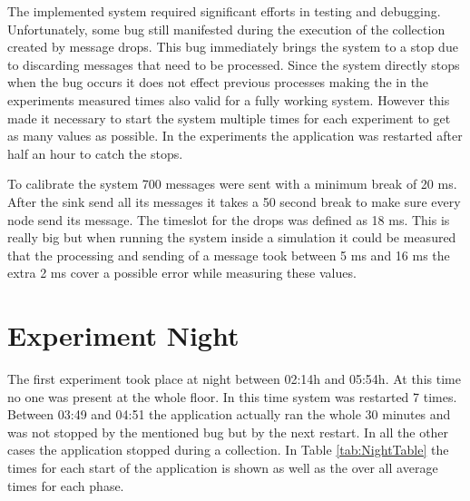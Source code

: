 The implemented system required significant efforts in testing and debugging. Unfortunately, some bug still manifested during the execution of the collection created by message drops. This bug immediately brings the system to a stop due to discarding messages that need to be processed. Since the system directly stops when the bug occurs it does not effect previous processes making the in the experiments measured times also valid for a fully working system. However this made it necessary to start the system multiple times for each experiment to get as many values as possible. In the experiments the application was restarted after half an hour to catch the stops.

To calibrate the system 700 messages were sent with a minimum break of 20 ms. After the sink send all its messages it takes a 50 second break to make sure every node send its message. The timeslot for the drops was defined as 18 ms. This is really big but when running the system inside a simulation it could be measured that the processing and sending of a message took between 5 ms and 16 ms the extra 2 ms cover a possible error while measuring these values.  
\section{Experiment Night}
The first experiment took place at night between 02:14h and 05:54h. At this time no one was present at the whole floor. In this time system was restarted 7 times. Between 03:49 and 04:51 the application actually ran the whole 30 minutes and was not stopped by the mentioned bug but by the next restart. In all the other cases the application stopped during a collection. In Table \ref{tab:NightTable} the times for each start of the application is shown as well as the over all average times for each phase. 

